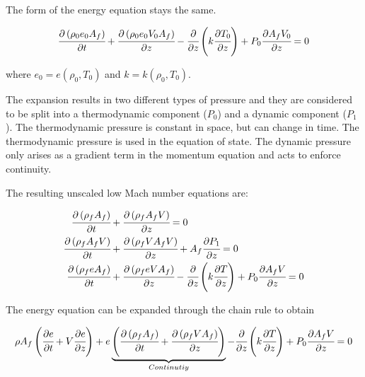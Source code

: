 \documentclass[../Parameter_fitting.tex]{subfiles}
\begin{document}
	The form of the energy equation stays the same. 
	
	{\footnotesize
		\begin{equation*}
			\cfrac{\partial \left( \rho_0 e_0 A_f \right) }{\partial t} + \cfrac{\partial \left( \rho_0 e_0 V_0 A_f \right)}{\partial z} - \cfrac{\partial}{\partial z} \left( k \cfrac{\partial T_0}{\partial z} \right) + P_0 \cfrac{\partial A_f V_0}{\partial z} = 0
		\end{equation*}
	}
	
	where $e_0 = e(\rho_0, T_0)$ and $k=k(\rho_0, T_0)$.
		
	The expansion results in two different types of pressure and they are considered to be split into a thermodynamic component ($P_0$) and a dynamic component ($P_1$). The thermodynamic pressure is constant in space, but can change in time. The thermodynamic pressure is used in the equation of state. The dynamic pressure only arises as a gradient term in the momentum equation and acts to enforce continuity.
	
	The resulting unscaled low Mach number equations are:
	
	{\footnotesize
		\begin{align*}
			\cfrac{\partial \left( \rho_f A_f \right)}{\partial t} &+ \cfrac{\partial \left( \rho_f A_f V \right)}{\partial z} = 0 \\
			\cfrac{\partial \left( \rho_f A_f V \right) }{\partial t}	&+ \cfrac{\partial \left( \rho_f V A_f V \right)}{\partial z} + A_f \cfrac{\partial P_1}{\partial z} = 0\\
			\cfrac{\partial \left( \rho_f e A_f \right) }{\partial t} &+ \cfrac{\partial \left( \rho_f e V A_f \right)}{\partial z} - \cfrac{\partial}{\partial z} \left( k \cfrac{\partial T}{\partial z} \right) + P_0 \cfrac{\partial A_f V}{\partial z} = 0
		\end{align*}
	}
	
	The energy equation can be expanded through the chain rule to obtain
	
	{\footnotesize
		\begin{equation*}
			 \rho A_f \left( \cfrac{\partial e }{\partial t} + V \cfrac{\partial e}{\partial z} \right) + e  \underbrace{ \left( \cfrac{\partial \left( \rho_f A_f \right) }{\partial t} + \cfrac{\partial \left( \rho_f V A_f \right)}{\partial z} \right) }_{Continutiy}  - \cfrac{\partial}{\partial z} \left( k \cfrac{\partial T}{\partial z} \right) + P_0 \cfrac{\partial A_f V}{\partial z} = 0
		\end{equation*}
	}
\end{document}
